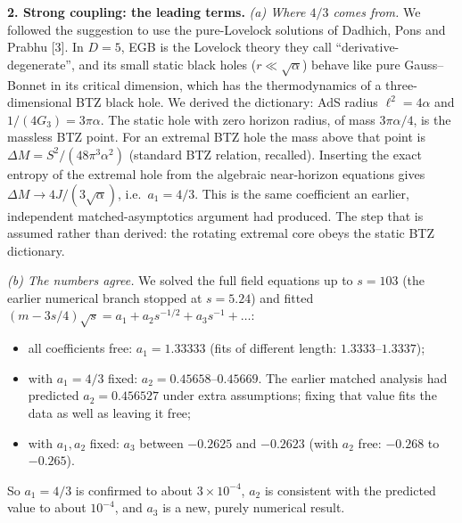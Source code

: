 \documentclass[10pt,a4paper]{article}
\begin{document}
\textbf{2. Strong coupling: the leading terms.}
\emph{(a) Where $4/3$ comes from.} We followed the suggestion to use the pure-Lovelock solutions of
Dadhich, Pons and Prabhu [3]. In $D=5$, EGB is the Lovelock theory they call ``derivative-degenerate'', and
its small static black holes ($r\ll\sqrt\alpha$) behave like pure Gauss--Bonnet in its critical dimension,
which has the thermodynamics of a three-dimensional BTZ black hole. We derived the dictionary: AdS radius
$\ell^2=4\alpha$ and $1/(4G_3)=3\pi\alpha$. The static hole with zero horizon radius, of mass $3\pi\alpha/4$,
is the massless BTZ point. For an extremal BTZ hole the mass above that point is
$\Delta M=S^2/(48\pi^3\alpha^2)$ (standard BTZ relation, recalled). Inserting the exact entropy of the
extremal hole from the algebraic near-horizon equations gives $\Delta M\to4J/(3\sqrt\alpha)$, i.e.\
$a_1=4/3$. This is the same coefficient an earlier, independent matched-asymptotics argument had
produced. The step that is assumed rather than derived: the rotating extremal core obeys the static BTZ
dictionary.

\emph{(b) The numbers agree.} We solved the full field equations up to $s=103$ (the earlier numerical branch stopped
at $s=5.24$) and fitted $(m-3s/4)\sqrt s=a_1+a_2s^{-1/2}+a_3s^{-1}+\dots$:
\begin{itemize}\itemsep0pt
\item all coefficients free: $a_1=1.33333$ (fits of different length: $1.3333$--$1.3337$);
\item with $a_1=4/3$ fixed: $a_2=0.45658$--$0.45669$. The earlier matched analysis had predicted
$a_2=0.456527$ under extra assumptions; fixing that value fits the data as well as leaving it free;
\item with $a_1,a_2$ fixed: $a_3$ between $-0.2625$ and $-0.2623$ (with $a_2$ free: $-0.268$ to $-0.265$).
\end{itemize}
So $a_1=4/3$ is confirmed to about $3\times10^{-4}$, $a_2$ is consistent with the predicted value to about $10^{-4}$,
and $a_3$ is a new, purely numerical result.
\end{document}
